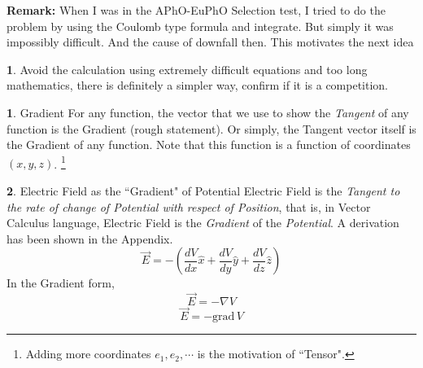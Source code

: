 \documentclass[11pt,a4paper,landscape,twocolumn]{article}
\theoremstyle{definition}
\newtheorem{fct}{ \framebox[0.05\textwidth]{{\sffamily Fact}} }
\theoremstyle{definition}
\theoremstyle{definition}
\newtheorem{idea}{ \framebox[0.05\textwidth]{{\sffamily Idea}} }
\theoremstyle{definition}
\begin{document}
{\scriptsize \textbf{Remark:} When I was in the APhO-EuPhO Selection test, I tried to do the problem by using the Coulomb type formula and integrate. But simply it was impossibly difficult. And the cause of downfall then. This motivates the next idea}

\begin{idea}
Avoid the calculation using extremely difficult equations and too long mathematics, there is definitely a simpler way, confirm if it is a competition.
\end{idea}
\begin{fct}{\sffamily Gradient}
For any function, the vector that we use to show the \emph{Tangent} of any function is the Gradient (rough statement). Or simply, the Tangent vector itself is the Gradient of any function. Note that this function is a function of coordinates $(x,y,z)$. \footnote{Adding more coordinates $e_1,e_2,\cdots$ is the motivation of ``Tensor".}
\end{fct}
\begin{fct} {\sffamily Electric Field as the ``Gradient" of Potential}
Electric Field is the \emph{Tangent to the rate of change of Potential with respect of Position}, that is, in Vector Calculus language, Electric Field is the \emph{Gradient} of the \emph{Potential}. A derivation has been shown in the Appendix.
\begin{equation}
 \vec{E} = - \left(	\frac{dV}{dx} \hat{x} + \frac{dV}{dy} \hat{y} + \frac{dV}{dz} \hat{z}\right) 
\end{equation}
In the Gradient form,
\begin{equation}
\vec{E} = - \nabla V
\end{equation}
\begin{equation}
\vec{E} = - \mathrm{grad} \, V 
\end{equation}

\end{fct}
\end{document}
